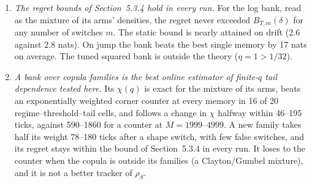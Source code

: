 \begin{enumerate}
    24 cells, and also wins across shape switches at fixed $\rho_S$). It is a worse tracker of
    $\rho_S$, because density accuracy favours much longer memories (an average of 1070--1710 ticks, against 615--815 for the method-of-moments bank).
  \item \emph{The regret bounds of Section~5.3.4 hold in every run.} For the log bank, read as
    the mixture of its arms' densities, the regret never exceeded $B_{T,m}(\delta)$ for any number
    of switches $m$. The static bound is nearly attained on drift ($2.6$ against $2.8$ nats). On
    jump the bank beats the best single memory by 17 nats on average. The tuned squared bank is
    outside the theory ($\eta=1>1/32$).
  \item \emph{A bank over copula families is the best online estimator of finite-$q$ tail
    dependence tested here.} Its $\chi(q)$ is exact for the mixture of its arms, beats an
    exponentially weighted corner counter at every memory in 16 of 20 regime--threshold--tail cells,
    and follows a change in $\chi$ halfway within 46--195 ticks, against 590--1860 for a counter at
    $M=1999$--$4999$. A new family takes half its weight 78--180 ticks after a shape switch, with
    few false switches, and its regret stays within the bound of Section~5.3.4 in every run. It
    loses to the counter when the copula is outside its families (a Clayton/Gumbel mixture), and it
    is not a better tracker of $\rho_S$.
\end{enumerate}
